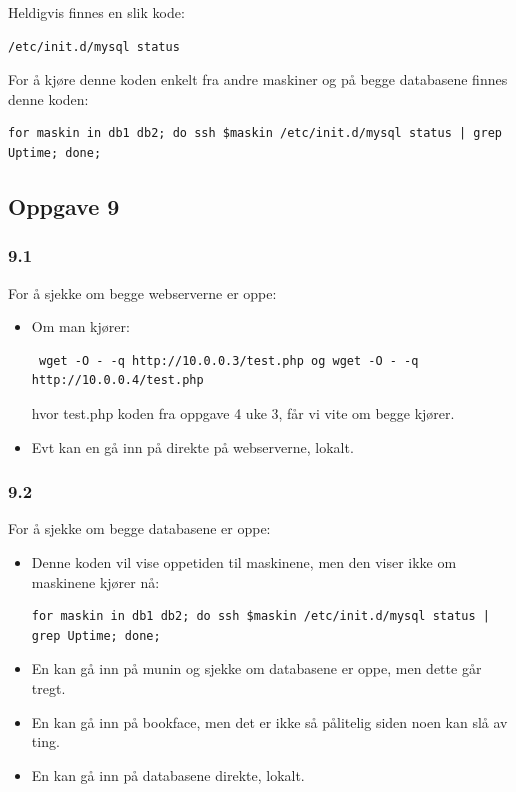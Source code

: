 \documentclass[a4paper, norsk, 12pt]{article}
\begin{document}
Heldigvis finnes en slik kode:\hspace*{\fill} \\[-\dimexpr\baselineskip+\parskip\relax]
\begin{verbatim}
/etc/init.d/mysql status
\end{verbatim}
For å kjøre denne koden enkelt fra andre maskiner og på begge databasene finnes denne koden:\hspace*{\fill} \\[-\dimexpr\baselineskip+\parskip\relax]
\begin{verbatim}
for maskin in db1 db2; do ssh $maskin /etc/init.d/mysql status | grep Uptime; done;
\end{verbatim}
\subsection{Oppgave 9}
\subsubsection*{9.1} 

For å sjekke om begge webserverne er oppe: 
\begin{itemize}
\item Om man kjører: \hspace*{\fill} \\[-\dimexpr\baselineskip+\parskip\relax]
\begin{verbatim}
 wget -O - -q http://10.0.0.3/test.php og wget -O - -q http://10.0.0.4/test.php 
\end{verbatim} 
hvor test.php koden fra oppgave 4 uke 3, får vi vite om begge kjører.

\item Evt kan en gå inn på direkte på webserverne, lokalt.
\end{itemize}

\subsubsection*{9.2} For å sjekke om begge databasene er oppe:
\begin{itemize}
\item Denne koden vil vise oppetiden til maskinene, men den viser ikke om maskinene kjører nå:   \hspace*{\fill} \\[-\dimexpr\baselineskip+\parskip\relax]  
\begin{verbatim}
for maskin in db1 db2; do ssh $maskin /etc/init.d/mysql status | grep Uptime; done;
\end{verbatim}

\item En kan gå inn på munin og sjekke om databasene er oppe, men dette går tregt.

\item En kan gå inn på bookface, men det er ikke så pålitelig siden noen kan slå av ting.

\item En kan gå inn på databasene direkte, lokalt.
\end{itemize}
\end{document}
